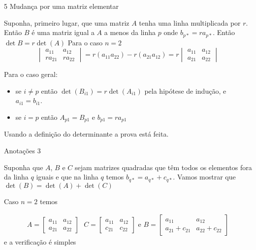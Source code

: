 \documentclass{beamer}
\begin{document}
\begin{frame}{5 Mudança por uma matriz elementar}

  Suponha, primeiro lugar, que uma matriz $A$ tenha uma linha multiplicada por $r$. Então $B$ é uma matriz 
  igual a $A$ a menos da linha $p$ onde $b_{p*}=ra_{p*}$. Então $\det{B} =r\det(A)$
  Para o caso $n=2$
  $$ \begin{vmatrix}
    a_{11} & a_{12} \\
    ra_{21}& ra_{22}
  \end{vmatrix}= r(a_{11}a_{22}) - r(a_{21}a_{12}) =r \begin{vmatrix}
    a_{11} & a_{12} \\
    a_{21}& a_{22}
  \end{vmatrix} $$

  Para o caso geral:
  \begin{itemize}
    \item se $i\neq p$ então $\det(B_{i1}) =r\det(A_{i1})$ pela hipótese de indução, e $a_{i1}=b_{i1}$.
    \item se $i=p$ então $A_{p1} = B_{p1}$ e $b_{p1} = ra_{p1}$
  \end{itemize}

  Usando a definição do determinante a prova está feita.
  
\end{frame}

\begin{frame}{Anotações 3}
  
\end{frame}

\begin{frame}
  Suponha que $A$, $B$ e $C$ sejam matrizes quadradas que têm todos os elementos fora da linha $q$ iguais e
  que na linha $q$ temos $b_{q*} = a_{q*} + c_{q*}$. Vamos mostrar que $\det(B) = \det(A) + \det(C)$

Caso $n=2$ temos

\begin{gather*}
  A = \begin{bmatrix}a_{11} & a_{12} \\
  a_{21}& a_{22}\end{bmatrix} \text{ } C= \begin{bmatrix}a_{11} & a_{12} \\
  c_{21}& c_{22}\end{bmatrix} \text{ e }B= \begin{bmatrix}a_{11} & a_{12} \\
  a_{21}+ c_{21}& a_{22}+c_{22}\end{bmatrix}
\end{gather*}
e a verificação é simples
\end{frame}
\end{document}

